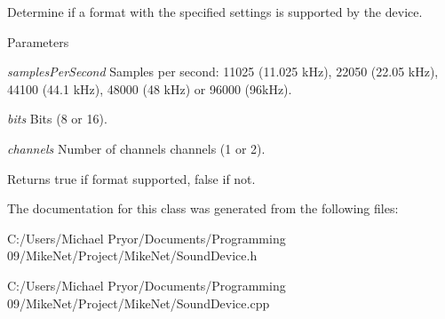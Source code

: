 Determine if a format with the specified settings is supported by the device. 


\begin{DoxyParams}{Parameters}
\item[{\em samplesPerSecond}]Samples per second: 11025 (11.025 kHz), 22050 (22.05 kHz), 44100 (44.1 kHz), 48000 (48 kHz) or 96000 (96kHz). \item[{\em bits}]Bits (8 or 16). \item[{\em channels}]Number of channels channels (1 or 2).\end{DoxyParams}
\begin{DoxyReturn}{Returns}
true if format supported, false if not. 
\end{DoxyReturn}


The documentation for this class was generated from the following files:\begin{DoxyCompactItemize}
\item 
C:/Users/Michael Pryor/Documents/Programming 09/MikeNet/Project/MikeNet/SoundDevice.h\item 
C:/Users/Michael Pryor/Documents/Programming 09/MikeNet/Project/MikeNet/SoundDevice.cpp\end{DoxyCompactItemize}
